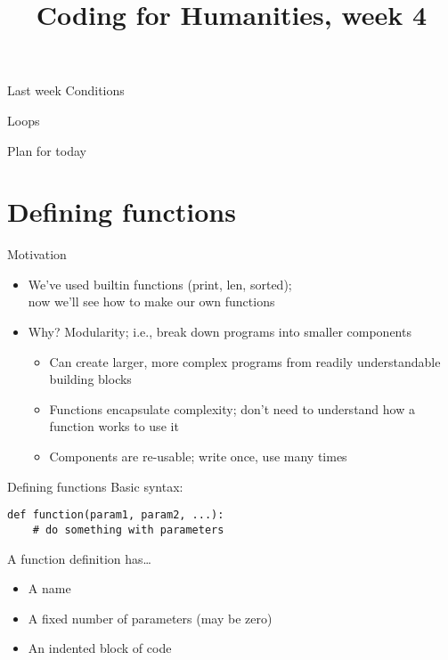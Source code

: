 \documentclass[aspectratio=169,usenames,dvipsnames]{beamer}
\title{Coding for Humanities, week 4}
\begin{document}
\begin{frame}
 \titlepage
\end{frame}

\begin{frame}{Last week}
    Conditions

    Loops
\end{frame}

\begin{frame}{Plan for today}
 \tableofcontents
\end{frame}


\section{Defining functions}
\frame{\tableofcontents[currentsection]}

\begin{frame}{Motivation}
    \begin{itemize}
        \item We've used builtin functions (print, len, sorted);\\
            now we'll see how to make our own functions
        \item Why? Modularity; i.e., break down programs into smaller components
            \begin{itemize}
                \item Can create larger, more complex programs
                    from readily understandable building blocks
                \item Functions encapsulate complexity;
                    don't need to understand how a function works to use it
                \item Components are re-usable;
                    write once, use many times
            \end{itemize}
    \end{itemize}
\end{frame}

\begin{frame}[fragile]{Defining functions}
    Basic syntax:
\begin{lstlisting}
def function(param1, param2, ...):
    # do something with parameters
\end{lstlisting}

    A function definition has\dots
    \begin{itemize}
        \item A name
        \item A fixed number of parameters (may be zero)
        \item An indented block of code
    \end{itemize}
\end{frame}
\end{document}
